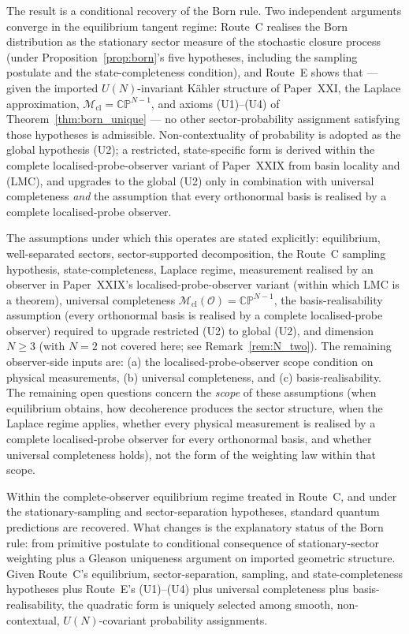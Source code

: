 \documentclass[12pt]{article}
\newcommand{\Ocal}{\mathcal{O}}
\newcommand{\Mcl}{\mathcal{M}_{\mathrm{cl}}}
\begin{document}
The result is a conditional recovery of the Born rule. Two independent arguments converge in the equilibrium tangent regime: Route~C realises the Born distribution as the stationary sector measure of the stochastic closure process (under Proposition~\ref{prop:born}'s five hypotheses, including the sampling postulate and the state-completeness condition), and Route~E shows that --- given the imported $U(N)$-invariant K\"ahler structure of Paper~XXI, the Laplace approximation, $\Mcl = \mathbb{CP}^{N-1}$, and axioms (U1)--(U4) of Theorem~\ref{thm:born_unique} --- no other sector-probability assignment satisfying those hypotheses is admissible. Non-contextuality of probability is adopted as the global hypothesis (U2); a restricted, state-specific form is derived within the complete localised-probe-observer variant of Paper~XXIX from basin locality and (LMC), and upgrades to the global (U2) only in combination with universal completeness \emph{and} the assumption that every orthonormal basis is realised by a complete localised-probe observer.

The assumptions under which this operates are stated explicitly: equilibrium, well-separated sectors, sector-supported decomposition, the Route~C sampling hypothesis, state-completeness, Laplace regime, measurement realised by an observer in Paper~XXIX's localised-probe-observer variant (within which LMC is a theorem), universal completeness $\Mcl(\Ocal) = \mathbb{CP}^{N-1}$, the basis-realisability assumption (every orthonormal basis is realised by a complete localised-probe observer) required to upgrade restricted (U2) to global (U2), and dimension $N \geq 3$ (with $N = 2$ not covered here; see Remark~\ref{rem:N_two}). The remaining observer-side inputs are: (a) the localised-probe-observer scope condition on physical measurements, (b) universal completeness, and (c) basis-realisability. The remaining open questions concern the \emph{scope} of these assumptions (when equilibrium obtains, how decoherence produces the sector structure, when the Laplace regime applies, whether every physical measurement is realised by a complete localised-probe observer for every orthonormal basis, and whether universal completeness holds), not the form of the weighting law within that scope.

Within the complete-observer equilibrium regime treated in Route~C, and under the stationary-sampling and sector-separation hypotheses, standard quantum predictions are recovered. What changes is the explanatory status of the Born rule: from primitive postulate to conditional consequence of stationary-sector weighting plus a Gleason uniqueness argument on imported geometric structure. Given Route~C's equilibrium, sector-separation, sampling, and state-completeness hypotheses plus Route~E's (U1)--(U4) plus universal completeness plus basis-realisability, the quadratic form is uniquely selected among smooth, non-contextual, $U(N)$-covariant probability assignments.
\end{document}
